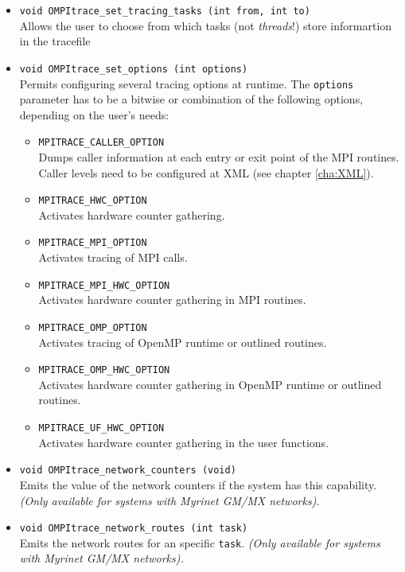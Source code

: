 \begin{itemize}
 \item {\tt void OMPItrace\_set\_tracing\_tasks (int from, int to)}\\
  Allows the user to choose from which tasks (not {\em threads}!) store informartion in the tracefile

 \item {\tt void OMPItrace\_set\_options (int options)}\\
  Permits configuring several tracing options at runtime. The {\tt options} parameter has to be a bitwise or combination of the following options, depending on the user's needs:
  \begin{itemize}
   \item {\tt MPITRACE\_CALLER\_OPTION}\\
    Dumps caller information at each entry or exit point of the MPI routines. Caller levels need to be configured at XML (see chapter \ref{cha:XML}).
   \item {\tt MPITRACE\_HWC\_OPTION}\\
    Activates hardware counter gathering.
   \item {\tt MPITRACE\_MPI\_OPTION}\\
    Activates tracing of MPI calls.
   \item {\tt MPITRACE\_MPI\_HWC\_OPTION}\\
    Activates hardware counter gathering in MPI routines.
   \item {\tt MPITRACE\_OMP\_OPTION}\\
    Activates tracing of OpenMP runtime or outlined routines.
   \item {\tt MPITRACE\_OMP\_HWC\_OPTION}\\
    Activates hardware counter gathering in OpenMP runtime or outlined routines.
   \item {\tt MPITRACE\_UF\_HWC\_OPTION}\\
    Activates hardware counter gathering in the user functions.
  \end{itemize}

 \item {\tt void OMPItrace\_network\_counters (void)}\\
  Emits the value of the network counters if the system has this capability. {\em (Only available for systems with Myrinet GM/MX networks).}

 \item {\tt void OMPItrace\_network\_routes (int task)}\\
  Emits the network routes for an specific {\tt task}. {\em (Only available for systems with Myrinet GM/MX networks).}

\end{itemize}

